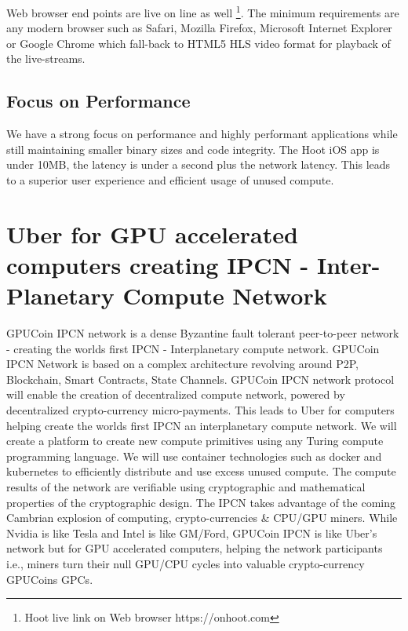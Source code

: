 \documentclass{article}
\begin{document}
Web browser end points are live on line as well
\footnote{Hoot live link on Web browser https://onhoot.com}. The minimum requirements are any modern
browser such as Safari, Mozilla Firefox, Microsoft Internet Explorer or Google Chrome which fall-back to HTML5 HLS video format for playback
of the live-streams.

\subsection{Focus on Performance}
We have a strong focus on performance and highly performant applications while still maintaining smaller binary sizes and code integrity. The Hoot iOS app is under 10MB, the latency is under a second plus the network latency. This leads to a superior user experience and efficient usage of unused compute.

\section{Uber for GPU accelerated computers creating IPCN - Inter-Planetary Compute Network}
GPUCoin IPCN network is a dense Byzantine fault tolerant peer-to-peer network - creating the worlds first IPCN - Interplanetary compute network. GPUCoin IPCN Network is based on a complex architecture revolving around P2P, Blockchain, Smart Contracts, State Channels. GPUCoin IPCN network protocol will enable the creation of decentralized compute network, powered by decentralized crypto-currency micro-payments. This leads to Uber for computers helping create the worlds first IPCN an interplanetary compute network. We will create a platform to create new compute primitives using any Turing compute programming language. We will use container technologies such as docker and kubernetes to efficiently distribute and use excess unused compute. The compute results of the network are verifiable using cryptographic and mathematical properties of the cryptographic design. The IPCN takes advantage of the coming Cambrian explosion of computing, crypto-currencies \& CPU/GPU miners. While Nvidia is like Tesla and Intel is like GM/Ford, GPUCoin IPCN is like Uber's network but for GPU accelerated computers, helping the network participants i.e., miners turn their null GPU/CPU cycles into valuable crypto-currency GPUCoins GPCs.
\end{document}
